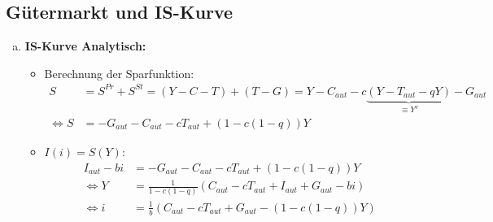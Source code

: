 \documentclass{scrartcl}
\begin{document}
\subsection{G\"{u}termarkt und IS-Kurve}
\begin{enumerate}[(a)]
\item \textbf{IS-Kurve Analytisch:}
\begin{itemize}
\item Berechnung der Sparfunktion:
\begin{align*}
  S &= S^{Pr} + S^{St} = (Y-C-T) + (T-G) = Y-C_{aut} -c\underbrace{(Y-T_{aut} - q Y)}_{\equiv Y^v} - G_{aut}\\
  \Leftrightarrow S&= -G_{aut} - C_{aut} - c T_{aut} + (1-c(1-q))Y
\end{align*}
\item $I(i)=S(Y):$
\begin{align*}
  I_{aut} - b i &= -G_{aut} - C_{aut} - c T_{aut} + (1-c(1-q))Y\\
  \Leftrightarrow Y &= \frac{1}{1-c(1-q)}(C_{aut} - c T_{aut} + I_{aut} + G_{aut} - b i)\\
  \Leftrightarrow i &=\frac{1}{b}(C_{aut} -c T_{aut} + G_{aut} - (1-c(1-q))Y)
\end{align*}
\end{itemize}


\end{enumerate}
\end{document}
